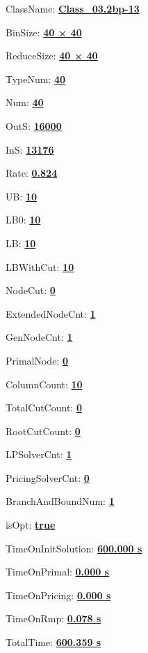 \documentclass[11pt]{article}
\begin{document}
\pagestyle{empty}


ClassName: \underline{\textbf{Class_03.2bp-13}}
\par
BinSize: \underline{\textbf{40 × 40}}
\par
ReduceSize: \underline{\textbf{40 × 40}}
\par
TypeNum: \underline{\textbf{40}}
\par
Num: \underline{\textbf{40}}
\par
OutS: \underline{\textbf{16000}}
\par
InS: \underline{\textbf{13176}}
\par
Rate: \underline{\textbf{0.824}}
\par
UB: \underline{\textbf{10}}
\par
LB0: \underline{\textbf{10}}
\par
LB: \underline{\textbf{10}}
\par
LBWithCut: \underline{\textbf{10}}
\par
NodeCut: \underline{\textbf{0}}
\par
ExtendedNodeCnt: \underline{\textbf{1}}
\par
GenNodeCnt: \underline{\textbf{1}}
\par
PrimalNode: \underline{\textbf{0}}
\par
ColumnCount: \underline{\textbf{10}}
\par
TotalCutCount: \underline{\textbf{0}}
\par
RootCutCount: \underline{\textbf{0}}
\par
LPSolverCnt: \underline{\textbf{1}}
\par
PricingSolverCnt: \underline{\textbf{0}}
\par
BranchAndBoundNum: \underline{\textbf{1}}
\par
isOpt: \underline{\textbf{true}}
\par
TimeOnInitSolution: \underline{\textbf{600.000 s}}
\par
TimeOnPrimal: \underline{\textbf{0.000 s}}
\par
TimeOnPricing: \underline{\textbf{0.000 s}}
\par
TimeOnRmp: \underline{\textbf{0.078 s}}
\par
TotalTime: \underline{\textbf{600.359 s}}
\par
\newpage


\end{document}

